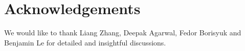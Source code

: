 \section{Acknowledgements}
We would like to thank Liang Zhang, Deepak Agarwal, Fedor Borisyuk and Benjamin Le 
for detailed and insightful discussions.
